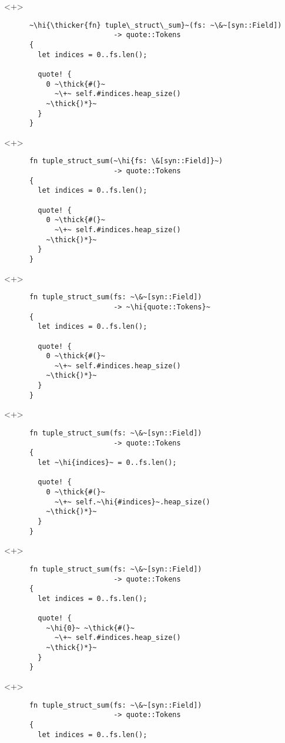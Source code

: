 \documentclass[usepdftitle=false]{beamer}
\renewcommand{\&}{\makebox[\widthof{\ampersand}][c]{\scalebox{0.9}[1.0]{\Book\ampersand}}}
\newcommand{\+}{\makebox[\widthof{+}][c]{\raisebox{-.2\height}{\scalefont{1.5}\Light+}}}
\newcommand{\thick}[1]{\contourlength{0.12pt}\contour[10]{black}{#1}}
\newcommand{\thicker}[1]{\contourlength{0.26pt}\contour[10]{black}{#1}}
\newcommand{\hi}[1]{%
\tikz[baseline=(A.base)]
 \node[highlighting=0,inner sep=0pt,text depth=0pt] (A) {#1};%
}
\begin{document}
\begin{frame}[fragile]
  \begin{onlyenv}<+>
    \begin{verbatim}
      ~\hi{\thicker{fn} tuple\_struct\_sum}~(fs: ~\&~[syn::Field])
                          -> quote::Tokens
      {
        let indices = 0..fs.len();

        quote! {
          0 ~\thick{#(}~
            ~\+~ self.#indices.heap_size()
          ~\thick{)*}~
        }
      }
    \end{verbatim}
  \end{onlyenv}
  \begin{onlyenv}<+>
    \begin{verbatim}
      fn tuple_struct_sum(~\hi{fs: \&[syn::Field]}~)
                          -> quote::Tokens
      {
        let indices = 0..fs.len();

        quote! {
          0 ~\thick{#(}~
            ~\+~ self.#indices.heap_size()
          ~\thick{)*}~
        }
      }
    \end{verbatim}
  \end{onlyenv}
  \begin{onlyenv}<+>
    \begin{verbatim}
      fn tuple_struct_sum(fs: ~\&~[syn::Field])
                          -> ~\hi{quote::Tokens}~
      {
        let indices = 0..fs.len();

        quote! {
          0 ~\thick{#(}~
            ~\+~ self.#indices.heap_size()
          ~\thick{)*}~
        }
      }
    \end{verbatim}
  \end{onlyenv}
  \begin{onlyenv}<+>
    \begin{verbatim}
      fn tuple_struct_sum(fs: ~\&~[syn::Field])
                          -> quote::Tokens
      {
        let ~\hi{indices}~ = 0..fs.len();

        quote! {
          0 ~\thick{#(}~
            ~\+~ self.~\hi{#indices}~.heap_size()
          ~\thick{)*}~
        }
      }
    \end{verbatim}
  \end{onlyenv}
  \begin{onlyenv}<+>
    \begin{verbatim}
      fn tuple_struct_sum(fs: ~\&~[syn::Field])
                          -> quote::Tokens
      {
        let indices = 0..fs.len();

        quote! {
          ~\hi{0}~ ~\thick{#(}~
            ~\+~ self.#indices.heap_size()
          ~\thick{)*}~
        }
      }
    \end{verbatim}
  \end{onlyenv}
  \begin{onlyenv}<+>
    \begin{verbatim}
      fn tuple_struct_sum(fs: ~\&~[syn::Field])
                          -> quote::Tokens
      {
        let indices = 0..fs.len();


\end{verbatim}
\end{onlyenv}
\end{frame}
\end{document}
